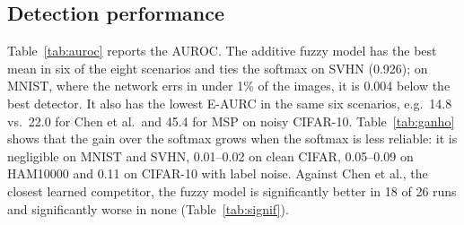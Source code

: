 \begin{table}[t]
\centering
\caption{Runs (seeds) in which the additive fuzzy model is significantly better (95\% CI, paired bootstrap) than Chen et al. and the output-only baseline.}
\label{tab:signif}
\end{table}


\subsection{Detection performance}
Table~\ref{tab:auroc} reports the AUROC. The additive fuzzy model has the best mean in six of the eight scenarios and ties the softmax
on SVHN (0.926); on MNIST, where the network errs in under 1\% of the images, it is 0.004 below the best detector. It also has the lowest
E-AURC in the same six scenarios, e.g.\ 14.8 vs.\ 22.0 for Chen et al.\ and 45.4 for MSP on noisy CIFAR-10.
Table~\ref{tab:ganho} shows that the gain over the softmax grows when the softmax is less reliable: it is negligible on MNIST and SVHN,
0.01--0.02 on clean CIFAR, 0.05--0.09 on HAM10000 and 0.11 on CIFAR-10 with label noise. Against Chen et al., the closest learned competitor,
the fuzzy model is significantly better in 18 of 26 runs and significantly worse in none (Table~\ref{tab:signif}).

